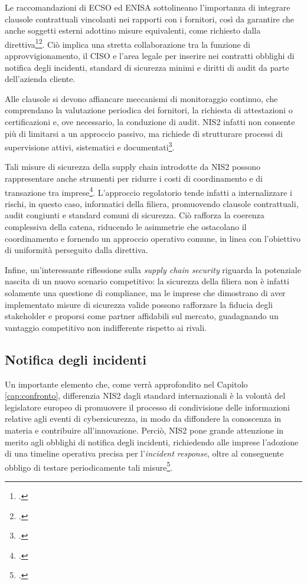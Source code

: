 Le raccomandazioni di ECSO ed ENISA sottolineano l’importanza 
di integrare clausole contrattuali vincolanti nei rapporti con i fornitori, così da garantire 
che anche soggetti esterni adottino misure equivalenti, come richiesto dalla direttiva\footcite[p. 2]{ecso-whitepaper-nis2}\footcite[p. 58]{enisa-implementing-guidance}. 
Ciò implica una stretta collaborazione tra la funzione di approvvigionamento, il CISO e
l’area legale per inserire nei contratti obblighi di notifica degli incidenti, 
standard di sicurezza minimi e diritti di audit da parte dell’azienda cliente.  

Alle clausole si devono affiancare meccanismi di monitoraggio continuo, che comprendano la valutazione periodica 
dei fornitori, la richiesta di attestazioni o certificazioni e, ove necessario, la conduzione di audit.
NIS2 infatti non consente più di limitarsi a un approccio passivo, ma richiede di strutturare processi di
supervisione attivi, sistematici e documentati\footcite[pp. 57--63]{enisa-implementing-guidance}.

Tali misure di sicurezza della supply chain introdotte da NIS2 possono rappresentare anche strumenti per ridurre i costi 
di coordinamento e di transazione tra imprese\footcite{testo-som}. L’approccio regolatorio tende infatti a internalizzare i rischi, in questo caso,
informatici della filiera, promuovendo clausole contrattuali, audit congiunti e standard comuni di sicurezza. 
Ciò rafforza la coerenza complessiva della catena, riducendo le asimmetrie che ostacolano il coordinamento e fornendo
un approccio operativo comune, in linea con l'obiettivo di uniformità perseguito dalla direttiva.

Infine, un'interessante riflessione sulla \textit{supply chain security} riguarda la potenziale nascita di un nuovo scenario competitivo: 
la sicurezza della filiera non è infatti solamente una questione di compliance, 
ma le imprese che dimostrano di aver implementato misure di sicurezza valide possono rafforzare la fiducia degli stakeholder e 
proporsi come partner affidabili sul mercato, guadagnando un vantaggio competitivo non indifferente rispetto ai rivali.


\subsection{Notifica degli incidenti}
Un importante elemento che, come verrà approfondito nel Capitolo \ref{cap:confronto}, differenzia NIS2 dagli standard internazionali
è la volontà del legislatore europeo di promuovere il processo di condivisione delle informazioni relative agli
eventi di cybersicurezza, in modo da diffondere la conoscenza in materia e contribuire all'innovazione.
Perciò, NIS2 pone grande attenzione in merito agli obblighi di notifica degli incidenti, richiedendo alle imprese
l’adozione di una timeline operativa precisa per l'\textit{incident response}, oltre al conseguente 
obbligo di testare periodicamente tali misure\footcite[pp.~18--20]{enisa-cybersecurity-roles}.

